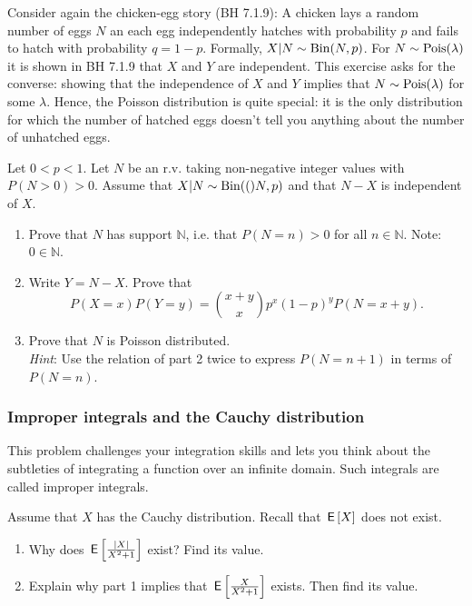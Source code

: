\documentclass[assignments]{subfiles}
\begin{document}
\begin{exercise} %
Consider again the chicken-egg story (BH 7.1.9): A chicken lays a random number of eggs $N$ an each egg independently hatches with probability $p$ and fails to hatch with probability $q = 1-p$. Formally, $X|N\sim\mathrm{Bin}(N,p)$.
For $N \sim \mathrm{Pois}(\lambda)$ it is shown in BH 7.1.9 that $X$ and $Y$ are independent.
This exercise asks for the converse: showing that the independence of $X$ and $Y$ implies that $N \sim \mathrm{Pois}(\lambda)$ for some $\lambda$. 
Hence, the Poisson distribution is quite special: it is the only distribution for which the number of hatched eggs doesn't tell you anything about the number of unhatched eggs.

Let $0 < p < 1$. Let $N$ be an r.v. taking non-negative integer values with $P(N > 0) > 0$. 
Assume that  $X|N\sim\mathrm{Bin}(()N,p)$ and that $N-X$ is independent of $X$.

\begin{enumerate}
\item Prove that $N$ has support $\mathbb N$, i.e. that $P(N=n) > 0$ for all $n \in \mathbb N$. Note: $0 \in \mathbb N$. 
\item Write $Y = N-X$. Prove that
 $$P(X=x)P(Y=y) = \binom{x+y}{x} p^x (1-p)^y P(N=x+y).$$ 
\item  Prove that $N$ is Poisson distributed. \\
  \textit{Hint}: Use the relation of part 2 twice to express $P(N=n+1)$ in terms of $P(N=n)$.
\end{enumerate}
\end{exercise}


\subsubsection{Improper integrals and the Cauchy distribution}

\begin{exercise} %
This problem challenges your integration skills and lets you think about the subtleties of integrating a function over an infinite domain. Such integrals are called improper integrals. 

Assume that $X$ has the Cauchy distribution. Recall that $\,\mathsf{E}\left[X\right]$ does not exist.
\begin{enumerate}
\item Why does $\,\mathsf{E}\left[\frac{|X|}{X^2+1}\right]$ exist? Find its value.
\item Explain why part 1 implies that $\,\mathsf{E}\left[\frac{X}{X^2+1}\right]$ exists. Then find its value.
\end{enumerate}
\end{exercise}
\end{document}
